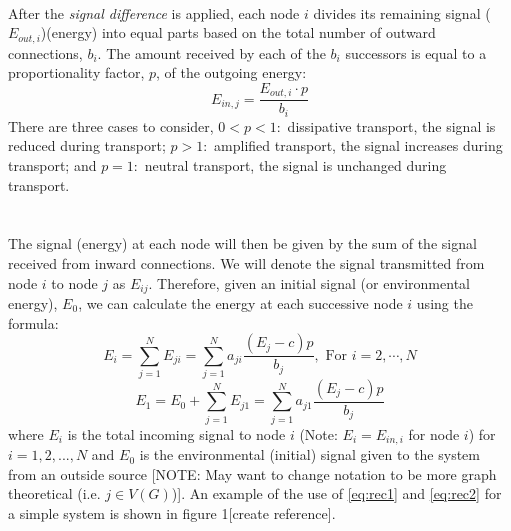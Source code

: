 \documentclass{amsart}
\theoremstyle{plain}
\numberwithin{equation}{section}
\begin{document}
\\
After the \textit{signal difference} is applied, each node $i$ divides its remaining signal ($E_{out,i}$)(energy) into equal parts based on the total number of outward connections, $b_i$. The amount received by each of the $b_i$ successors is equal to a proportionality factor, $p$, of the outgoing energy: 
\begin{equation}
E_{in,j}=\frac{E_{out,i}\cdot p}{b_i}
\end{equation} There are three cases to consider, $0<p<1: $ dissipative transport, the signal is reduced during transport; $p > 1: $ amplified transport, the signal increases during transport; and $p=1: $ neutral transport, the signal is unchanged during transport.\\
\\
\\
The signal (energy) at each node will then be given by the sum of the signal received from inward connections. We will denote the signal transmitted from node $i$ to node $j$ as $E_{ij}$. Therefore, given an initial signal (or environmental energy), $E_0$, we can calculate the energy at each successive node $i$ using the formula: 
\begin{equation}\label{eq:rec1}
E_i=\sum_{j=1}^N E_{ji}=\sum_{j=1}^N a_{ji}\frac{(E_j-c)p}{b_j}, \text{ For } i=2,\cdots, N 
\end{equation}
\begin{equation}\label{eq:rec2}
E_1=E_0+\sum_{j=1}^N E_{j1}=\sum_{j=1}^N a_{j1}\frac{(E_j-c)p}{b_j}
\end{equation}
where $E_i$ is the total incoming signal to node $i$ (Note: $E_i=E_{in, i}$ for node $i$) for $i=1,2,...,N$ and $E_0$ is the environmental (initial) signal given to the system from an outside source [NOTE: May want to change notation to be more graph theoretical (i.e. $j\in V(G)$)]. An example of the use of \ref{eq:rec1} and \ref{eq:rec2} for a simple system is shown in figure 1[create reference]. 
\\
\end{document}
